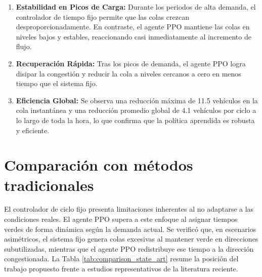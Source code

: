 \begin{enumerate}
    \item \textbf{Estabilidad en Picos de Carga:} Durante los periodos de alta demanda, el controlador de tiempo fijo permite que las colas crezcan desproporcionadamente. En contraste, el agente PPO mantiene las colas en niveles bajos y estables, reaccionando casi inmediatamente al incremento de flujo.
    \item \textbf{Recuperación Rápida:} Tras los picos de demanda, el agente PPO logra disipar la congestión y reducir la cola a niveles cercanos a cero en menos tiempo que el sistema fijo.
    \item \textbf{Eficiencia Global:} Se observa una reducción máxima de 11.5 vehículos en la cola instantánea y una reducción promedio global de 4.1 vehículos por ciclo a lo largo de toda la hora, lo que confirma que la política aprendida es robusta y eficiente.
\end{enumerate}

\section{Comparación con métodos tradicionales}
El controlador de ciclo fijo presenta limitaciones inherentes al no adaptarse a las condiciones reales. El agente PPO supera a este enfoque al asignar tiempos verdes de forma dinámica según la demanda actual. Se verificó que, en escenarios asimétricos, el sistema fijo genera colas excesivas al mantener verde en direcciones subutilizadas, mientras que el agente PPO redistribuye ese tiempo a la dirección congestionada. La Tabla \ref{tab:comparison_state_art} resume la posición del trabajo propuesto frente a estudios representativos de la literatura reciente.

\begin{table}[H]
\centering
\caption{Comparación cualitativa con trabajos relacionados.}
\label{tab:comparison_state_art}
\end{table}

